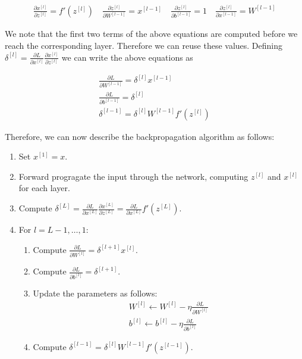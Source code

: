 \documentclass{article}
\begin{document}
\begin{gather*}
\frac{\partial x^{[l]}}{\partial z^{[l]}} = f'(z^{[l]}) \quad
\frac{\partial z^{[l]}}{\partial W^{[l-1]}} = x^{[l-1]} \quad
\frac{\partial z^{[l]}}{\partial b^{[l-1]}} = 1 \quad
\frac{\partial z^{[l]}}{\partial x^{[l-1]}} = W^{[l-1]}
\end{gather*}

We note that the first two terms of the above equations are computed before we reach the corresponding layer. 
Therefore we can reuse these values.
Defining $\delta^{[l]} = \frac{\partial L}{\partial x^{[l]}} \frac{\partial x^{[l]}}{\partial z^{[l]}}$ we can write the above equations as

\begin{gather*}
\frac{\partial L}{\partial W^{[l-1]}} = \delta^{[l]} x^{[l-1]} \\
\frac{\partial L}{\partial b^{[l-1]}} = \delta^{[l]} \\
\delta^{[l-1]} = \delta^{[l]} W^{[l-1]} f'(z^{[l]})
\end{gather*}

Therefore, we can now describe the backpropagation algorithm as follows:
\begin{enumerate}
\item Set $x^{[1]} = x$.
\item Forward progragate the input through the network, computing $z^{[l]}$ and $x^{[l]}$ for each layer.
\item Compute $\delta^{[L]} = \frac{\partial L}{\partial x^{[L]}} \frac{\partial x^{[L]}}{\partial z^{[L]}} = \frac{\partial L}{\partial x^{[L]}} f'(z^{[L]})$.
\item For $l = L-1, \dots, 1$:
\begin{enumerate}
\item Compute $\frac{\partial L}{\partial W^{[l]}} = \delta^{[l+1]} x^{[l]}$.
\item Compute $\frac{\partial L}{\partial b^{[l]}} = \delta^{[l+1]}$.
\item Update the parameters as follows:
\begin{gather*}
W^{[l]} \leftarrow W^{[l]} - \eta \frac{\partial L}{\partial W^{[l]}} \\
b^{[l]} \leftarrow b^{[l]} - \eta \frac{\partial L}{\partial b^{[l]}}
\end{gather*}
\item Compute $\delta^{[l-1]} = \delta^{[l]} W^{[l-1]} f'(z^{[l-1]})$.
\end{enumerate}
\end{enumerate}
\end{document}
